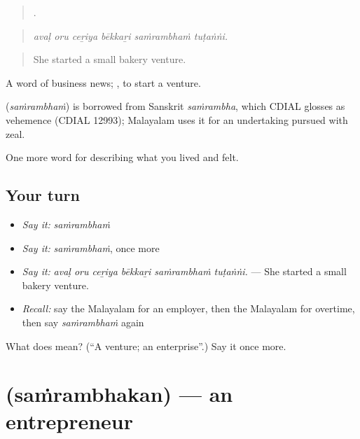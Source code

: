 \begin{quote}
     .
\end{quote}

\begin{quote}
\emph{avaḷ oru ceṟiya bēkkaṟi saṁrambhaṁ tuṭaṅṅi.}
\end{quote}

\begin{quote}
She started a small bakery venture.
\end{quote}

A word of business news;  , to start a venture.

\begin{cousinweb}
\textbf{} (\emph{saṁrambhaṁ}) is borrowed from Sanskrit \emph{saṁrambha}, which CDIAL glosses as vehemence (CDIAL 12993); Malayalam uses it for an undertaking pursued with zeal.
\end{cousinweb}

\begin{grammarlens}[title={What you've built}]
One more word for describing what you lived and felt.
\end{grammarlens}

\subsection*{Your turn}
\begin{itemize}
\raggedright
  \item \emph{Say it:} \emph{saṁrambhaṁ}
  \item \emph{Say it:} \emph{saṁrambhaṁ}, once more
  \item \emph{Say it:} \emph{avaḷ oru ceṟiya bēkkaṟi saṁrambhaṁ tuṭaṅṅi.} — She started a small bakery venture.
  \item \emph{Recall:} say the Malayalam for an employer, then the Malayalam for overtime, then say \emph{saṁrambhaṁ} again
\end{itemize}

\begin{tcolorbox}[breakable,colback=teal!4,colframe=teal!35!black,title={Before you move on}]
What does  mean? (\textquotedblleft{}A venture; an enterprise\textquotedblright{}.) Say it once more.
\end{tcolorbox}
\section[\texorpdfstring{\ml{സംരംഭകൻ} (saṁrambhakan)}{സംരംഭകൻ (saṁrambhakan)}]{ (saṁrambhakan) — an entrepreneur}

